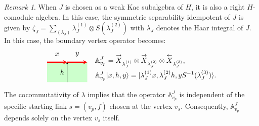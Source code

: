 \documentclass[a4paper,11pt]{article}
\theoremstyle{theorem}
\theoremstyle{remark}
\newtheorem{remark}{Remark}[section]
\newcommand{\Av}{\mathbb{A}}
\newcommand{\XR}{\overset{\rightarrow}{X}}
\newcommand{\XL}{\overset{\leftarrow}{X}}
\newcommand{\cone}{(1)}
\newcommand{\ctwo}{(2)}
\newcommand{\cthree}{(3)}
\begin{document}
\begin{remark}
When \( J \) is chosen as a weak Kac subalgebra of \( H \), it is also a right \( H \)-comodule algebra. In this case, the symmetric separability idempotent of \( J \) is given by
$\zeta_J = \sum_{(\lambda_J)} \lambda_J^{(1)} \otimes S(\lambda_J^{(2)})$ with \( \lambda_J \) denotes the Haar integral of \( J \).
In this case, the boundary vertex operator becomes:
\begin{equation}
    \begin{aligned}
    \begin{tikzpicture}
    \begin{scope}[rotate=-90] %
        \fill[green!20] (0, 0) rectangle (1,2); %
        \draw[-stealth,red,line width = 1.6pt] (0,0) -- (0,1);
        \draw[-stealth,red, line width = 1.6pt] (0,1) -- (0,2); 
        \draw[-stealth,black] (1,1) -- (0,1); 
        \node[ line width=0.2pt, dashed, draw opacity=0.5] (a) at (-0.4,0.5){$x$};
        \node[ line width=0.2pt, dashed, draw opacity=0.5] (a) at (-0.4,1.5){$y$};
        \node[ line width=0.2pt, dashed, draw opacity=0.5] (a) at (0.5,0.75){$h$};
    \end{scope}
\end{tikzpicture} \end{aligned} 
 \quad 
 \begin{aligned}
    & \Av^J_{v_p}=\XR_{\lambda_J^{\cone}}\otimes \XR_{\lambda_J^{\ctwo}}\otimes \XL_{\lambda_J^{\cthree}},\\
    & \Av^J_{v_p}|x,h,y\rangle= |\lambda_J^{\cone}x, \lambda_J^{\ctwo} h, yS^{-1}(\lambda_J^{\cthree})\rangle.
 \end{aligned}
\end{equation} 
The cocommutativity of \(\lambda\) implies that the operator \(\Av^J_{v_p}\) is independent of the specific starting link \(s = (v_p, f)\) chosen at the vertex \(v_s\). Consequently, \(\Av^J_{v_p}\) depends solely on the vertex \(v_s\) itself.
\end{remark}
\end{document}
